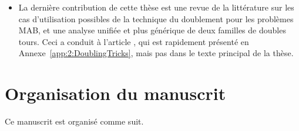 \begin{resume_fr}
\begin{itemize}
    \item
    La dernière contribution de cette thèse est une revue de la littérature sur les cas d'utilisation possibles de la technique du doublement pour les problèmes MAB,
    et une analyse unifiée et plus générique de deux familles de doubles tours.
    Ceci a conduit à l'article \cite{Besson2018DoublingTricks}, qui est rapidement présenté en Annexe~\ref{app:2:DoublingTricks}, mais pas dans le texte principal de la thèse.
\end{itemize}

\section*{Organisation du manuscrit}

Ce manuscrit est organisé comme suit.


\end{resume_fr}
